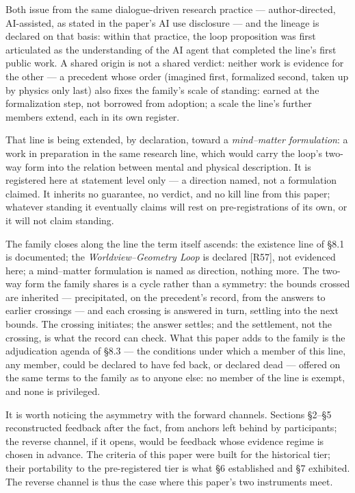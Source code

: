 \documentclass[11pt,a4paper]{article}
\begin{document}
Both issue from the same dialogue-driven research practice — author-directed, AI-assisted, as stated in the paper's AI use disclosure — and the lineage is declared on that basis: within that practice, the loop proposition was first articulated as the understanding of the AI agent that completed the line's first public work. A shared origin is not a shared verdict: neither work is evidence for the other — a precedent whose order (imagined first, formalized second, taken up by physics only last) also fixes the family's scale of standing: earned at the formalization step, not borrowed from adoption; a scale the line's further members extend, each in its own register.

That line is being extended, by declaration, toward a \textit{mind--matter formulation}: a work in preparation in the same research line, which would carry the loop's two-way form into the relation between mental and physical description. It is registered here at statement level only — a direction named, not a formulation claimed. It inherits no guarantee, no verdict, and no kill line from this paper; whatever standing it eventually claims will rest on pre-registrations of its own, or it will not claim standing.

The family closes along the line the term itself ascends: the existence line of §8.1 is documented; the \textit{Worldview--Geometry Loop} is declared [R57], not evidenced here; a mind--matter formulation is named as direction, nothing more. The two-way form the family shares is a cycle rather than a symmetry: the bounds crossed are inherited — precipitated, on the precedent's record, from the answers to earlier crossings — and each crossing is answered in turn, settling into the next bounds. The crossing initiates; the answer settles; and the settlement, not the crossing, is what the record can check. What this paper adds to the family is the adjudication agenda of §8.3 — the conditions under which a member of this line, any member, could be declared to have fed back, or declared dead — offered on the same terms to the family as to anyone else: no member of the line is exempt, and none is privileged.

It is worth noticing the asymmetry with the forward channels. Sections §2–§5 reconstructed feedback after the fact, from anchors left behind by participants; the reverse channel, if it opens, would be feedback whose evidence regime is chosen in advance. The criteria of this paper were built for the historical tier; their portability to the pre-registered tier is what §6 established and §7 exhibited. The reverse channel is thus the case where this paper's two instruments meet.
\end{document}
